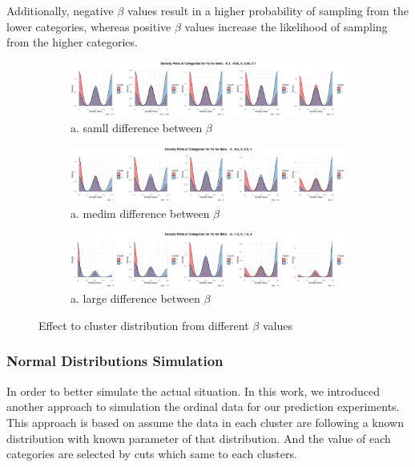 \documentclass{article}
\begin{document}
Additionally, negative $\beta$ values result in a higher probability of sampling from the lower categories, 
whereas positive $\beta$ values increase the likelihood of sampling from the higher categories.
\begin{figure}[h]
  \centering
  \begin{subfigure}{1.0\textwidth}
      \centering
      \includegraphics[width=\textwidth]{images/para_sim/beta_1.png}
      \caption*{a. samll difference between $\beta$}
  \end{subfigure}

  \begin{subfigure}{1.0\textwidth}
      \centering
      \includegraphics[width=\textwidth]{images/para_sim/beta_2.png}
      \caption*{a. medim difference between $\beta$}
    \end{subfigure}

  \begin{subfigure}{1.0\textwidth}
      \centering
      \includegraphics[width=\textwidth]{images/para_sim/beta_3.png}
      \caption*{a. large difference between $\beta$}
  \end{subfigure}
  
  \caption{Effect to cluster distribution from different $\beta$ values}
  \label{fig:beta}
\end{figure}


\subsubsection{Normal Distributions Simulation}

In order to better simulate the actual situation.
In this work, we introduced another approach to simulation the ordinal data 
for our prediction experiments. 
This approach is based on assume the data in each cluster are following 
a known distribution with known parameter of that distribution.
And the value of each categories are selected by cuts which same to each clusters.
\end{document}
